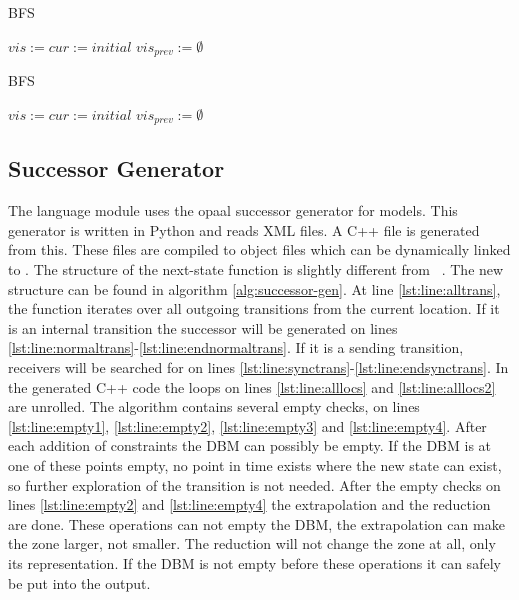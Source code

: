 \begin{algorithm}
\caption{BFS}\label{alg:bfs-check}
\begin{algorithmic}[1]
	\State $vis := cur := initial$
	\State $vis_{prev} := \emptyset$
	\EndWhile
	
\EndProcedure	
\end{algorithmic}
\end{algorithm}

\begin{algorithm}
\caption{BFS}\label{alg:bfs-no-minus}
\begin{algorithmic}[1]
	\State $vis := cur := initial$
	\State $vis_{prev} := \emptyset$
	\EndWhile
	
\EndProcedure	
\end{algorithmic}
\end{algorithm}

\subsection{Successor Generator}
The language module uses the opaal successor generator for \uppaal{} models. This generator is written in Python and reads \uppaal{} XML files. A C++ file is generated from this. These files are compiled to object files which can be dynamically linked to \ltsmin{}. The structure of the next-state function is slightly different from ~\cite{eemcs21972}. The new structure can be found in algorithm \ref{alg:successor-gen}. At line \ref{lst:line:alltrans}, the function iterates over all outgoing transitions from the current location. If it is an internal transition the successor will be generated on lines \ref{lst:line:normaltrans}-\ref{lst:line:endnormaltrans}. If it is a sending transition, receivers will be searched for on lines \ref{lst:line:synctrans}-\ref{lst:line:endsynctrans}. In the generated C++ code the loops on lines \ref{lst:line:alllocs} and \ref{lst:line:alllocs2} are unrolled. The algorithm contains several empty checks, on lines \ref{lst:line:empty1},  \ref{lst:line:empty2}, \ref{lst:line:empty3} and \ref{lst:line:empty4}. After each addition of constraints the DBM can possibly be empty. If the DBM is at one of these points empty, no point in time exists where the new state can exist, so further exploration of the transition is not needed. After the empty checks on lines \ref{lst:line:empty2} and \ref{lst:line:empty4} the extrapolation and the reduction are done. These operations can not empty the DBM, the extrapolation can make the zone larger, not smaller. The reduction will not change the zone at all, only its representation. If the DBM is not empty before these operations it can safely be put into the output.

